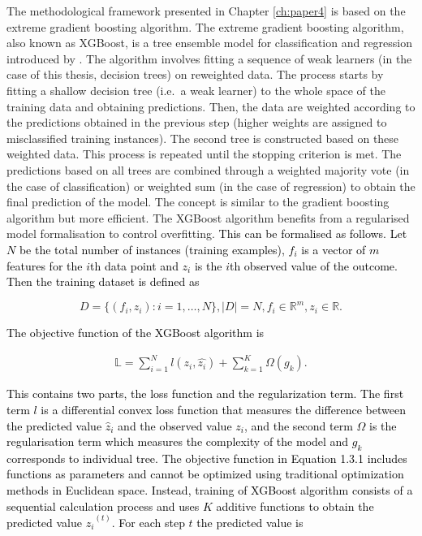 \documentclass{monashthesis}
\begin{document}
The methodological framework presented in Chapter \ref{ch:paper4} is based on the extreme gradient boosting algorithm. The extreme gradient boosting algorithm, also known as XGBoost, is a tree ensemble model for classification and regression introduced by \textcite{chen2016xgboost}. The algorithm involves fitting a sequence of weak learners (in the case of this thesis, decision trees) on reweighted data. The process starts by fitting a shallow decision tree (i.e.~a weak learner) to the whole space of the training data and obtaining predictions. Then, the data are weighted according to the predictions obtained in the previous step (higher weights are assigned to misclassified training instances). The second tree is constructed based on these weighted data. This process is repeated until the stopping criterion is met. The predictions based on all trees are combined through a weighted majority vote (in the case of classification) or weighted sum (in the case of regression) to obtain the final prediction of the model. The concept is similar to the gradient boosting algorithm \autocite{friedman2001greedy} but more efficient. The XGBoost algorithm benefits from a regularised model formalisation to control overfitting. \textcolor{black}{This can be formalised as follows. Let $N$ be the total number of instances (training examples), $f_i$ is a vector of $m$ features for the $i$th data point and $z_i$ is the $i$th observed value of the outcome. Then the training dataset is defined as}

\vspace*{-\baselineskip}

\[D=\{(f_i, z_i): i =1,\dots, N\}, |D|=N, f_i \in \mathbb{R}^m, z_i \in \mathbb{R}.\]

\textcolor{black}{The objective function of the XGBoost algorithm is}

\vspace*{-\baselineskip}

\begin{align}
\mathbb{L}=\sum_{i=1}^{N}l( z_i, \hat{z_i})+\sum_{k=1}^K \Omega(g_{k}).
\end{align}

\textcolor{black}{This contains two parts, the loss function and the regularization term. The first term $l$ is a differential convex loss function that measures the difference between the predicted value $\hat{z}_i$ and the observed value $z_i$, and the second term $\Omega$ is the regularisation term which measures the complexity of the model and $g_k$ corresponds to individual tree. The objective function in Equation  1.3.1 includes functions as parameters and cannot be optimized using traditional optimization methods in Euclidean space. Instead, training of XGBoost algorithm consists of a sequential calculation process and uses $K$ additive functions to obtain the predicted value $\hat{z_i}^{(t)}$.  For each step $t$ the predicted value is}
\end{document}
